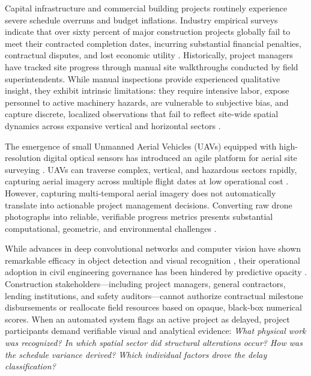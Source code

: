 \documentclass[conference]{IEEEtran}
\begin{document}
Capital infrastructure and commercial building projects routinely experience severe schedule overruns and budget inflations. Industry empirical surveys indicate that over sixty percent of major construction projects globally fail to meet their contracted completion dates, incurring substantial financial penalties, contractual disputes, and lost economic utility \cite{flyvbjerg2002underestimating, assaf2006causes}. Historically, project managers have tracked site progress through manual site walkthroughs conducted by field superintendents. While manual inspections provide experienced qualitative insight, they exhibit intrinsic limitations: they require intensive labor, expose personnel to active machinery hazards, are vulnerable to subjective bias, and capture discrete, localized observations that fail to reflect site-wide spatial dynamics across expansive vertical and horizontal sectors \cite{reja2022computer, rehman2022automated}.

The emergence of small Unmanned Aerial Vehicles (UAVs) equipped with high-resolution digital optical sensors has introduced an agile platform for aerial site surveying \cite{siebert2014mobile, nex2014uav}. UAVs can traverse complex, vertical, and hazardous sectors rapidly, capturing aerial imagery across multiple flight dates at low operational cost \cite{roberts2019end}. However, capturing multi-temporal aerial imagery does not automatically translate into actionable project management decisions. Converting raw drone photographs into reliable, verifiable progress metrics presents substantial computational, geometric, and environmental challenges \cite{golparvar2015automated}.

While advances in deep convolutional networks and computer vision have shown remarkable efficacy in object detection and visual recognition \cite{he2016deep, jocher2023yolo}, their operational adoption in civil engineering governance has been hindered by predictive opacity \cite{gunning2019xai}. Construction stakeholders—including project managers, general contractors, lending institutions, and safety auditors—cannot authorize contractual milestone disbursements or reallocate field resources based on opaque, black-box numerical scores. When an automated system flags an active project as delayed, project participants demand verifiable visual and analytical evidence: \textit{What physical work was recognized? In which spatial sector did structural alterations occur? How was the schedule variance derived? Which individual factors drove the delay classification?}
\end{document}
